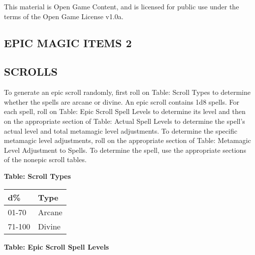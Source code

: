 \documentclass{article}
\begin{document}
This material is Open Game Content, and is licensed for public use under the terms 
of the Open Game License v1.0a.

\subsection*{{\LARGE{}EPIC MAGIC ITEMS 2}}

\vspace{12pt}
\subsection*{{\LARGE{}SCROLLS }}

To generate an epic scroll randomly, first roll on Table: Scroll Types to determine 
whether the spells are arcane or divine. An epic scroll contains 1d8 spells. For 
each spell, roll on Table: Epic Scroll Spell Levels to determine its level and 
then on the appropriate section of Table: Actual Spell Levels to determine the 
spell's actual level and total metamagic level adjustments. To determine the specific 
metamagic level adjustments, roll on the appropriate section of Table: Metamagic 
Level Adjustment to Spells. To determine the spell, use the appropriate sections 
of the nonepic scroll tables. 

\vspace{12pt}
\textbf{Table: Scroll Types }

\begin{tabular}{|>{\raggedright}p{28pt}|>{\raggedright}p{27pt}|}
\hline
d\textbf{\%} & T\textbf{ype }\tabularnewline
\hline
01-70 & Arcane \tabularnewline
\hline
71-100 & Divine \tabularnewline
\hline
\end{tabular}

\vspace{12pt}
\textbf{Table: Epic Scroll Spell Levels}
\end{document}
